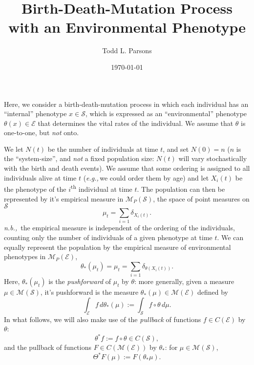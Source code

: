 \documentclass[11pt]{amsart}
\theoremstyle{remark}
\theoremstyle{definition}
\newcommand{\eg}{\textit{e.g.,}\,}
\newcommand{\nb}{\textit{n.b.,}\, }
\begin{document}
\title{Birth-Death-Mutation Process with an Environmental Phenotype}
\author{Todd L. Parsons}
\address{Laboratoire de Probabilit\'es, Statistique et Mod\'elisation, UMR8001, Sorbonne Universit\'e, Paris, 75005, France.}


\date{\today}



\maketitle

Here, we consider a birth-death-mutation process in which each individual has an ``internal'' phenotype $x \in \mathcal{S}$, which is expressed as an ``environmental'' phenotype $\theta(x) \in \mathcal{E}$ that determines the vital rates of the individual.  We assume that $\theta$ is one-to-one, but \emph{not} onto.  

We let $N(t)$ be the number of individuals at time $t$, and set $N(0) = n$ ($n$ is the ``system-size'', and \emph{not} a fixed population size: $N(t)$ will vary stochastically with the birth and death events).  We assume that some ordering is assigned to all individuals alive at time $t$ (\eg we could order them by age) and let $X_{i}(t)$ be the phenotype of the $i$\textsuperscript{th} individual at time $t$.  The population can then be represented by it's empirical measure in $\mathcal{M}_{P}(\mathcal{S})$, the space of point measures on $\mathcal{S}$
\[
	 \mu_{t} = \sum_{i=1} \delta_{X_{i}(t)}.
\]
\nb the empirical measure is independent of the ordering of the individuals, counting only the number of individuals of a given phenotype at time $t$.  We can equally represent the population by the empirical measure of environmental phenotypes in $\mathcal{M}_{P}(\mathcal{E})$, 
\[
	\theta_{*}(\mu_{t}) = \mu_{t} = \sum_{i=1} \delta_{\theta(X_{i}(t))}.
\]
Here, $\theta_{*}(\mu_{t})$ is the \textit{pushforward} of $\mu_{t}$ by $\theta$: more generally, given a measure $\mu \in \mathcal{M}(\mathcal{S})$, it's pushforward is the measure $\theta_{*}(\mu) \in \mathcal{M}(\mathcal{E})$ defined by
\[
	\int_{\mathcal{E}} f\, d\theta_{*}(\mu) := \int_{\mathcal{S}} f\circ\theta\,  d\mu.
\] 
In what follows, we will also make use of the \textit{pullback} of functions $f \in C(\mathcal{E})$ by $\theta$:
\[
	\theta^{*}f := f\circ\theta \in C(\mathcal{S}),
\]
and the pullback of functions $F \in C(\mathcal{M}(\mathcal{E}))$ by $\theta_{*}$: for $\mu \in \mathcal{M}(\mathcal{S})$,
\[
	\Theta^{*}F(\mu) := F(\theta_{*}\mu).
\]
\end{document}

